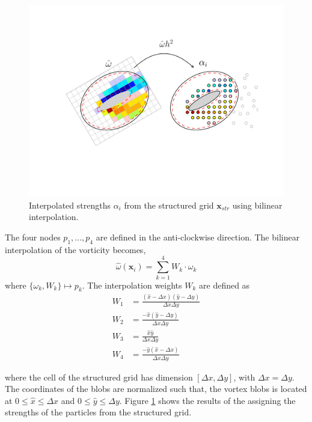 	\begin{figure}[!b]
	\centering
	\includegraphics[trim=2.55cm 3.35cm 2.05cm 2.5cm, clip, width=0.9\linewidth]{./figures/hybrid/interpolation/ellipse/interpolation_StructuredGrid2Blobs.pdf}
	\caption{Interpolated strengths $\alpha_i$ from the structured grid $\mathbf{x}_{str}$ using bilinear interpolation.}
	\label{fig:interpolation_StructuredGrid2Blobs}
	\end{figure}	

The four nodes $p_1,...,p_4$ are defined in the anti-clockwise direction. The bilinear interpolation of the vorticity becomes,
	\begin{equation}
	\hat{\omega}(\mathbf{x}_i) = \sum_{k=1}^4 W_k\cdot \omega_k
	\end{equation}
where $\{\omega_k, W_k\} \mapsto p_k$. The interpolation weights $W_k$ are defined as 
	\begin{equation}
	\begin{aligned}
	W_1 &= \frac{(\hat{x} - \Delta x )(\hat{y}-\Delta y)}{\Delta x \Delta y}\\
	W_2 &= \frac{-\hat{x}(\hat{y}-\Delta y)}{\Delta x \Delta y}\\
	W_3 &= \frac{\hat{x} \hat{y}}{\Delta x \Delta y}\\
	W_4 &= \frac{-\hat{y}(\hat{x} - \Delta x )}{\Delta x \Delta y}
	\end{aligned}
	\end{equation}

	
where the cell of the structured grid has dimension $[\Delta x, \Delta y]$, with $\Delta x= \Delta y$. The coordinates of the blobs are normalized such that, the vortex blobs is located at $0\leqslant\hat{x}\leqslant\Delta x$ and $0\leqslant\hat{y}\leqslant\Delta y$. Figure \ref{fig:interpolation_StructuredGrid2Blobs} shows the results of the assigning the strengths of the particles from the structured grid. 
	
